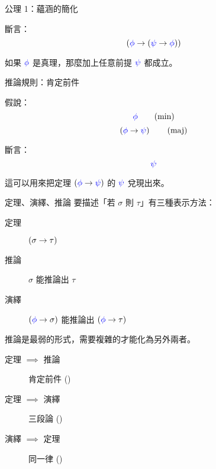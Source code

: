 \documentclass{Slideshow}
\begin{document}
\begin{frame}[label=ax-1]{公理 1：蘊涵的簡化}
    \begin{axiom}[\mmurl{ax-1}]
        斷言：
        \[ \left( {\color{blue}\phi} \to \left( {\color{blue}\psi} \to {\color{blue}\phi} \right) \right) \]
    \end{axiom}

    如果 ${\color{blue}\phi}$ 是真理，那麼加上任意前提 ${\color{blue}\psi}$ 都成立。
\end{frame}


\begin{frame}[label=ax-mp]{推論規則：肯定前件}
    \begin{axiom}[\mmurl{ax-mp}]
        假說：
        \[ {\color{blue}\phi}        \tag{min} \]
        \[ \left( {\color{blue}\phi} \to {\color{blue}\psi} \right) \tag{maj} \]

        斷言：
        \[ {\color{blue}\psi} \]
    \end{axiom}

    這可以用來把定理 $\left( {\color{blue}\phi} \to {\color{blue}\psi} \right)$ 的 ${\color{blue}\psi}$ 兌現出來。
\end{frame}

\begin{frame}{定理、演繹、推論}
    要描述「若 $\sigma$ 則 $\tau$」有三種表示方法：
    \begin{description}
        \item[定理] $\left( \sigma \to \tau \right)$
        \item[推論] $\sigma$ 能推論出 $\tau$
        \item[演繹] $\left( {\color{blue}\phi} \to \sigma \right)$ 能推論出 $\left( {\color{blue}\phi} \to \tau \right)$
    \end{description}

    推論是最弱的形式，需要複雜的才能化為另外兩者。
    \begin{description}
        \item[定理 $\implies$ 推論] 肯定前件 ()
        \item[定理 $\implies$ 演繹] 三段論 ()
        \item[演繹 $\implies$ 定理] 同一律 ()
    \end{description}
\end{frame}
\end{document}
